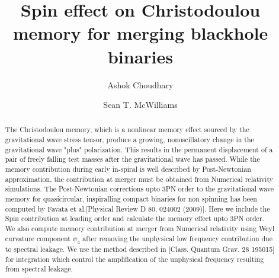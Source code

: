 \documentclass[prd,preprintnumbers,twocolumn,eqsecnum,floatfix,letter]{revtex4}
\begin{document}
\newcommand{\be}{\begin{equation}}
\newcommand{\ee}{\end{equation}}
\newcommand{\ber}{\begin{eqnarray}}
\newcommand{\eer}{\end{eqnarray}}
\def\bea{\begin{eqnarray}}
\def\eea{\end{eqnarray}}
\newcommand{\etal}{\emph{et al.}}

\newcommand{\Sl}{S_\ell}
\newcommand{\Sigmal}{\Sigma_\ell}
\newcommand{\Flux}{\mathcal{F}}
\newcommand{\LNh}{\hat{\mathbf{L}}_N}
\newcommand{\LN}{\mathbf{L}_N}
\newcommand{\bS}{\mathbf{S}}
\newcommand{\bJ}{\mathbf{J}}
\newcommand{\e}{\mathrm{e}}
\newcommand{\rmi}{\mathrm{i}}
\newcommand{\flow}{f_\mathrm{low}}
\newcommand{\fcut}{f_\mathrm{cut}}

\newcommand{\bchi}{\bm{\chi}}
\newcommand{\blambda}{\bm{\lambda}}
\newcommand{\bLambda}{\bm{\Lambda}}
\newcommand{\bchia}{\bm{\chi}_a}
\newcommand{\bchis}{\bm{\chi}_s}
\newcommand{\chis}{\chi_s}
\newcommand{\chia}{\chi_a}
\newcommand{\chiadL}{\bchia \cdot \LNh}
\newcommand{\chisdL}{\bchis \cdot \LNh}
\newcommand{\chisSqr}{\bchis^2}
\newcommand{\chiaSqr}{\bchia^2}
\newcommand{\chisDchia}{\bchis \cdot \bchia}
\newcommand{\cA}{\mathcal{A}}
\newcommand{\cB}{\mathcal{B}}
\newcommand{\cC}{\mathcal{C}}
\newcommand{\cP}{\mathcal{P}}
\newcommand{\pc}{{+,\times}}

\title{Spin effect on Christodoulou memory for merging blackhole binaries}
\author{Ashok Choudhary}
\author{Sean T. McWilliams}


\begin{abstract}
	The Christodoulou memory, which is a nonlinear memory effect sourced by the gravitational wave stress tensor, produce a growing, nonoscillatory change in the gravitational wave "plus" polarization. This results in the permanent displacement of a pair of freely falling test masses after the gravitational wave has passed. While the memory contribution during early in-spiral is well described by Post-Newtonian approximation, the contribution at merger must be obtained from Numerical relativity simulations. The Post-Newtonian corrections upto 3PN order to the gravitational wave memory for quasicircular, inspiralling compact binaries for non spinning has been computed by Favata et al.[Physical Review D 80, 024002 (2009)]. Here we include the Spin contribution at leading order and calculate the memory effect upto 3PN order. We also compute memory contribution at merger from Numerical relativity using Weyl curvature component $\psi_4$ after removing the unphysical low frequency contribution due to spectral leakage. We use the method described in [Class. Quantum Grav. 28 195015] for integration which control the amplification of the unphysical frequency resulting from spectral leakage. 
\end{abstract}
\end{document}
